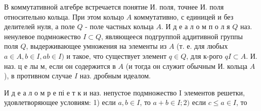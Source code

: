 \documentclass[10pt]{article}
\begin{document}
В коммутативной алгебре встречается понятие И. поля, точнее И. поля относительно кольца. При этом кольцо $A$ коммутативно, с единицей и без делителей нуля, а поле $Q$ - поле частных кольца $A$. И д е а л о м п о л я $Q$ наз. ненулевое подмножество $I \subset Q$, являющееся подгруппой аддитивной группы поля $Q$, выдерживающее умножения на элементы из $A$ (т. е. для любых $a \in A, b \in I, a b \in I)$ и такое, что существует элемент $q \in Q$, для к-рого $q I \subset A$. И. наз. ц е лы м, если он содержится в $A$ (и тогда он служит обычным И. кольца $A$ ), в противном случае $I$ наз. дробным идеалом.



И д е а л о м р е пі е т к и наз. непустое подмножество I элементов решетки, удовлетворяющее условиям: 1) если $a, b \in I$, то $a+b \in I ; 2)$ если $c \leqslant a \in I$, то
\end{document}
